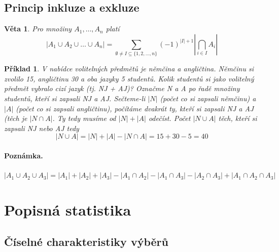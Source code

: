 \documentclass[12pt,a4paper]{article}
\newtheorem{sentence}{Věta}
\newtheorem{example}{Příklad}
\begin{document}
\subsection{Princip inkluze a exkluze}
\begin{sentence}
	Pro množiny $A_1, \dots, A_n$ platí $$|A_1 \cup A_2 \cup \dots \cup A_n| = \sum\limits_{\emptyset \neq I \subseteq \{1, 2, \dots , n \}} (-1)^{|I| + 1} |\bigcap_{i \in I} A_i |$$
\end{sentence}
\begin{example}
	V nabídce volitelných předmětů je němčina a angličtina. Němčinu si zvolilo 15, angličtinu 30 a oba jazyky 5 studentů. Kolik studentů si jako volitelný předmět vybralo cizí jazyk (tj. NJ + AJ)? Označme N a A po řadě množiny studentů, kteří si zapsali NJ a AJ. Sečteme-li $|N|$ (počet co si zapsali němčinu) a $|A|$ (počet co si zapsali angličtinu), počítáme dvakrát ty, kteří si zapsali NJ a AJ (těch je $|N \cap A|$. Ty tedy musíme od $|N| + |A|$ odečíst. Počet $|N \cup A|$ těch, kteří si zapsali NJ nebo AJ tedy $$|N \cup A| = |N| + |A| - |N \cap A| = 15 + 30 - 5 = 40$$
\end{example}
\paragraph{Poznámka.} $|A_1 \cup A_2 \cup A_3| = |A_1| + |A_2| + |A_3| - |A_1 \cap A_2| - |A_1 \cap A_3| - |A_2 \cap A_3| + |A_1 \cap A_2 \cap A_3|$

\section{Popisná statistika}
\subsection{Číselné charakteristiky výběrů}
\end{document}

